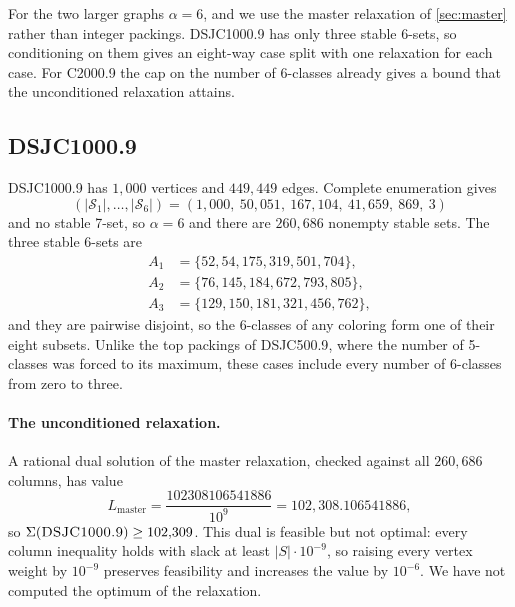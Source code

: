 \documentclass[11pt]{article}
\theoremstyle{definition}
\newcommand{\DSJCFiveHundred}{\textnormal{\textsc{DSJC500.9}}}
\newcommand{\DSJCThousand}{\textnormal{\textsc{DSJC1000.9}}}
\newcommand{\CTwoThousand}{\textnormal{\textsc{C2000.9}}}
\newcommand{\Stable}{\mathcal{S}}
\begin{document}
For the two larger graphs $\alpha=6$, and we use the master relaxation
of \cref{sec:master} rather than integer packings. \DSJCThousand{} has only
three stable 6-sets, so conditioning on them gives an eight-way case split
with one relaxation for each case. For \CTwoThousand{} the cap on the number
of 6-classes already gives a bound that the unconditioned relaxation attains.

\subsection{\DSJCThousand{}}
\label{sec:dsjc1000}

\DSJCThousand{} has $1{,}000$ vertices and $449{,}449$ edges. Complete
enumeration gives
\[
 (|\Stable_1|,\ldots,|\Stable_6|)=(1{,}000,\ 50{,}051,\ 167{,}104,\ 41{,}659,\ 869,\ 3)
\]
and no stable 7-set, so $\alpha=6$ and there are $260{,}686$ nonempty stable
sets. The three stable 6-sets are
\begin{align*}
 A_1&=\{52,54,175,319,501,704\},\\
 A_2&=\{76,145,184,672,793,805\},\\
 A_3&=\{129,150,181,321,456,762\},
\end{align*}
and they are pairwise disjoint, so the 6-classes of any coloring form one of
their eight subsets. Unlike the top packings of \DSJCFiveHundred{}, where the
number of 5-classes was forced to its maximum, these cases include every
number of 6-classes from zero to three.

\paragraph{The unconditioned relaxation.} A rational dual solution of the
master relaxation, checked against all $260{,}686$ columns, has value
\[
 L_{\mathrm{master}}=\frac{102308106541886}{10^9}=102{,}308.106541886,
\]
so $\Sigma(\DSJCThousand)\ge102{,}309$. This dual is feasible but not
optimal: every column inequality holds with slack at least $|S|\cdot10^{-9}$,
so raising every vertex weight by $10^{-9}$ preserves feasibility and
increases the value by $10^{-6}$. We have not computed the optimum of the
relaxation.
\end{document}
